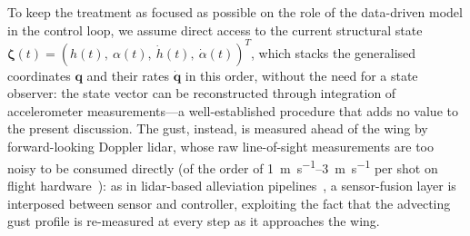 To keep the treatment as focused as possible on the role of the data-driven model in the control loop, we assume direct access to the current structural state $\boldsymbol{\zeta}(t) = (h(t),\ \alpha(t),\ \dot h(t),\ \dot\alpha(t))^{T}$, which stacks the generalised coordinates $\mathbf{q}$ and their rates $\dot{\mathbf{q}}$ in this order, without the need for a state observer: the state vector can be reconstructed through integration of accelerometer measurements---a well-established procedure that adds no value to the present discussion. The gust, instead, is measured ahead of the wing by forward-looking Doppler lidar, whose raw line-of-sight measurements are too noisy to be consumed directly (of the order of \SIrange{1}{3}{\meter\per\second} per shot on flight hardware~\cite{rabadan2010lidar}): as in lidar-based alleviation pipelines~\cite{fezans2017lidar,cavaliere2022estimator}, a sensor-fusion layer is interposed between sensor and controller, exploiting the fact that the advecting gust profile is re-measured at every step as it approaches the wing.

